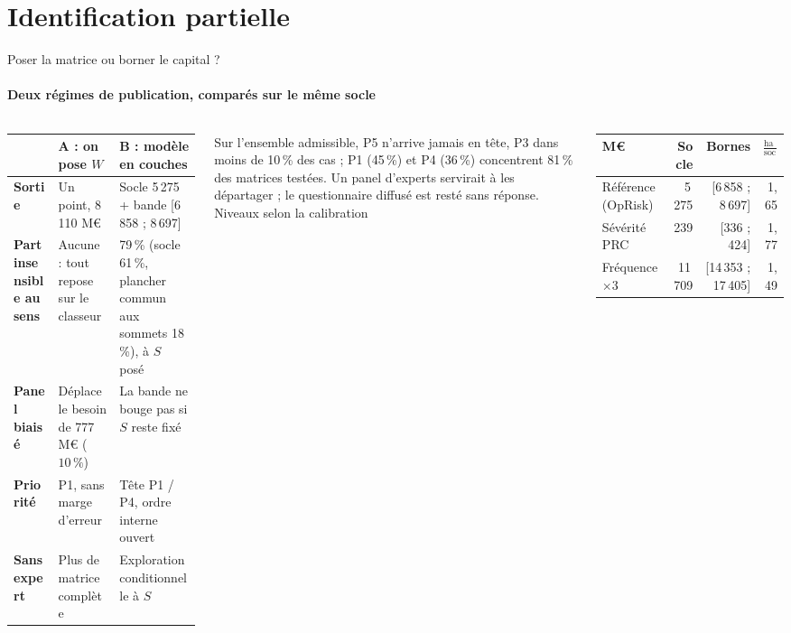 \documentclass[aspectratio=169,10pt,t]{beamer}
\renewcommand{\arraystretch}{1.25}
\begin{document}
\section{Identification partielle}
\begin{frame}{Poser la matrice ou borner le capital ?}
  \framesubtitle{\ajout Deux régimes de publication, comparés sur le même socle}
  \begin{columns}[T,onlytextwidth]
    \scriptsize
    \renewcommand{\arraystretch}{1.12}
    \begin{tabularx}{\linewidth}{@{}>{\bfseries}l Y Y@{}}
      \toprule
      & A : on pose $W$ & B : modèle en couches \\
      \midrule
      Sortie & Un point, 8\,110 M€ & Socle 5\,275 + bande [6\,858 ; 8\,697] \\
      Part insensible au sens & Aucune : tout repose sur le classeur & 79\,\% (socle 61\,\%, plancher commun aux sommets 18\,\%), à $S$ posé \\
      Panel biaisé & Déplace le besoin de 777 M€ ($10\,\%$) & La bande ne bouge pas si $S$ reste fixé \\
      Priorité & P1, sans marge d'erreur & Tête P1 / P4, ordre interne ouvert \\
      Sans expert & Plus de matrice complète & Exploration conditionnelle à $S$ \\
      \bottomrule
    \end{tabularx}\par\vspace{2mm}
    Sur l'ensemble admissible, P5 n'arrive jamais en tête, P3 dans moins de 10\,\% des cas ; P1 (45\,\%) et P4 (36\,\%) concentrent 81\,\% des matrices testées. Un panel d'experts servirait à les départager ; le questionnaire diffusé est resté sans réponse.
    \scriptsize
    {\editorial\normalsize Niveaux selon la calibration}\par\vspace{1mm}
    \renewcommand{\arraystretch}{1.12}
    \setlength{\tabcolsep}{3pt}\begin{tabular}{@{}lrrr@{}}
      \toprule
      M€ & Socle & Bornes & $\tfrac{\text{haute}}{\text{socle}}$ \\
      \midrule
      Référence (OpRisk) & 5\,275 & [6\,858 ; 8\,697] & 1,65 \\
      Sévérité PRC & 239 & [336 ; 424] & 1,77 \\
      Fréquence $\times3$ & 11\,709 & [14\,353 ; 17\,405] & 1,49 \\

\end{tabular}
\end{columns}
\end{frame}
\end{document}
